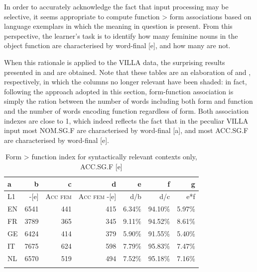 In order to accurately acknowledge the fact that input processing may be selective, it seems appropriate to compute function > form associations based on language exemplars in which the meaning in question is present. From this perspective, the learner’s task is to identify how many feminine nouns in the object function  are characterised by word-final [e], and how many are not. 

When this rationale is applied to the VILLA data, the surprising results presented in  and  are obtained. Note that these tables are an elaboration of  and , respectively, in which the columns no longer relevant have been shaded: in fact, following the approach adopted in this section, form-function association is simply the ration between the number of words including both form and function and the number of words encoding function regardless of form. Both association indexes are close to 1, which indeed reflects the fact that in the peculiar VILLA input most NOM.SG.F are characterised by word-final [a], and most ACC.SG.F are characterised by word-final [e].

\begin{table}
    \begin{tabularx}{\textwidth}{Xrrr rrr}
        \lsptoprule
        a & b & c & d & e & f & g\\
        \midrule
        L1 & {}-[e] & \textsc{Acc} \textsc{fem} & \textsc{Acc} \textsc{fem} -[e] & d/b & d/c & e*f\\
        EN & 6541 & 441 & 415 & 6.34\% & 94.10\% & 5.97\%\\
        FR & 3789 & 365 & 345 & 9.11\% & 94.52\% & 8.61\%\\
        GE & 6424 & 414 & 379 & 5.90\% & 91.55\% & 5.40\%\\
        IT & 7675 & 624 & 598 & 7.79\% & 95.83\% & 7.47\%\\
        NL & 6570 & 519 & 494 & 7.52\% & 95.18\% & 7.16\%\\
        \lspbottomrule
    \end{tabularx}
    \caption{Form > function index for syntactically relevant contexts only, ACC.SG.F [e]}
    \label{tab:08:1}
\end{table}

